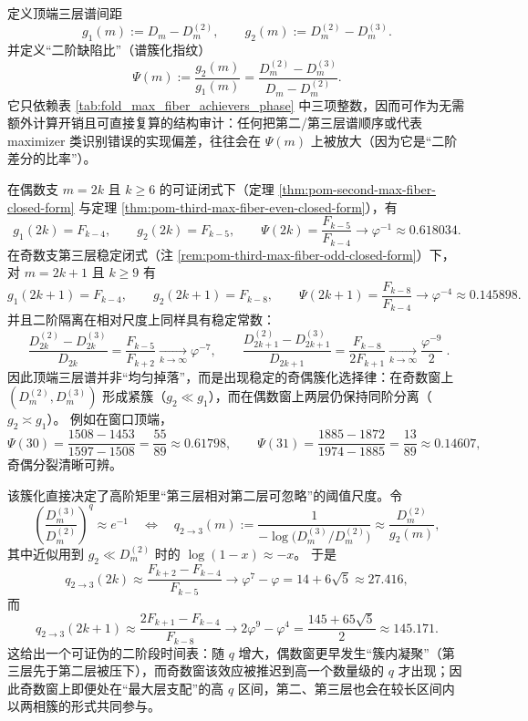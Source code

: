 \begin{remark}\label{rem:pom-spectrum-gap-ratio-fingerprint}
定义顶端三层谱间距
\[
g_{1}(m):=D_m-D_m^{(2)},
\qquad
g_{2}(m):=D_m^{(2)}-D_m^{(3)}.
\]
并定义“二阶缺陷比”（谱簇化指纹）
\[
\Psi(m):=\frac{g_2(m)}{g_1(m)}
=\frac{D_m^{(2)}-D_m^{(3)}}{D_m-D_m^{(2)}}.
\]
它只依赖表 \ref{tab:fold_max_fiber_achievers_phase} 中三项整数，因而可作为无需额外计算开销且可直接复算的结构审计：任何把第二/第三层谱顺序或代表 maximizer 类识别错误的实现偏差，往往会在 \(\Psi(m)\) 上被放大（因为它是“二阶差分的比率”）。
\par
在偶数支 \(m=2k\) 且 \(k\ge 6\) 的可证闭式下（定理 \ref{thm:pom-second-max-fiber-closed-form} 与定理 \ref{thm:pom-third-max-fiber-even-closed-form}），有
\[
g_1(2k)=F_{k-4},\qquad g_2(2k)=F_{k-5},
\qquad
\Psi(2k)=\frac{F_{k-5}}{F_{k-4}}
\longrightarrow \varphi^{-1}\approx 0.618034.
\]
在奇数支第三层稳定闭式（注 \ref{rem:pom-third-max-fiber-odd-closed-form}）下，对 \(m=2k+1\) 且 \(k\ge 9\) 有
\[
g_1(2k+1)=F_{k-4},\qquad g_2(2k+1)=F_{k-8},
\qquad
\Psi(2k+1)=\frac{F_{k-8}}{F_{k-4}}
\longrightarrow \varphi^{-4}\approx 0.145898.
\]
并且二阶隔离在相对尺度上同样具有稳定常数：
\[
\boxed{\;
\frac{D_{2k}^{(2)}-D_{2k}^{(3)}}{D_{2k}}
=\frac{F_{k-5}}{F_{k+2}}
\xrightarrow[k\to\infty]{}\varphi^{-7},\qquad
\frac{D_{2k+1}^{(2)}-D_{2k+1}^{(3)}}{D_{2k+1}}
=\frac{F_{k-8}}{2F_{k+1}}
\xrightarrow[k\to\infty]{}\frac{\varphi^{-9}}{2}\; }.
\]
因此顶端三层谱并非“均匀掉落”，而是出现稳定的奇偶簇化选择律：在奇数窗上 \((D_m^{(2)},D_m^{(3)})\) 形成紧簇（\(g_2\ll g_1\)），而在偶数窗上两层仍保持同阶分离（\(g_2\asymp g_1\)）。
例如在窗口顶端，
\[
\Psi(30)=\frac{1508-1453}{1597-1508}=\frac{55}{89}\approx 0.61798,\qquad
\Psi(31)=\frac{1885-1872}{1974-1885}=\frac{13}{89}\approx 0.14607,
\]
奇偶分裂清晰可辨。
\par
该簇化直接决定了高阶矩里“第三层相对第二层可忽略”的阈值尺度。令
\[
\left(\frac{D_m^{(3)}}{D_m^{(2)}}\right)^q\approx e^{-1}
\quad\Longleftrightarrow\quad
q_{2\to3}(m):=\frac{1}{-\log\!\bigl(D_m^{(3)}/D_m^{(2)}\bigr)}
\approx \frac{D_m^{(2)}}{g_2(m)},
\]
其中近似用到 \(g_2\ll D_m^{(2)}\) 时的 \(\log(1-x)\approx -x\)。
于是
\[
q_{2\to3}(2k)\approx \frac{F_{k+2}-F_{k-4}}{F_{k-5}}
\longrightarrow \varphi^7-\varphi=14+6\sqrt5\approx 27.416,
\]
而
\[
q_{2\to3}(2k+1)\approx \frac{2F_{k+1}-F_{k-4}}{F_{k-8}}
\longrightarrow 2\varphi^9-\varphi^4=\frac{145+65\sqrt5}{2}\approx 145.171.
\]
这给出一个可证伪的二阶段时间表：随 \(q\) 增大，偶数窗更早发生“簇内凝聚”（第三层先于第二层被压下），而奇数窗该效应被推迟到高一个数量级的 \(q\) 才出现；因此奇数窗上即便处在“最大层支配”的高 \(q\) 区间，第二、第三层也会在较长区间内以两相簇的形式共同参与。
\end{remark}

